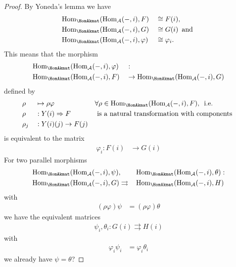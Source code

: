 \begin{proof}
By Yoneda's lemma we have 
\begin{alignat}{2}
&\mathrm{Hom}_{\HomAkmat}(\mathrm{Hom}_{\mathcal{A}}(-,i),F) &&\cong F(i), \\
&\mathrm{Hom}_{\HomAkmat}(\mathrm{Hom}_{\mathcal{A}}(-,i),G) &&\cong G(i)\, \text{ and } \\
&\mathrm{Hom}_{\HomAkmat}(\mathrm{Hom}_{\mathcal{A}}(-,i),\varphi) &&\cong \varphi_{i}.
\end{alignat}
This means that the morphism
\begin{alignat*}{2}
&\mathrm{Hom}_{\HomAkmat}(\mathrm{Hom}_{\mathcal{A}}(-,i),\varphi) &&:\\
&\mathrm{Hom}_{\HomAkmat}(\mathrm{Hom}_{\mathcal{A}}(-,i),F)
	&&\rightarrow \mathrm{Hom}_{\HomAkmat}(\mathrm{Hom}_{\mathcal{A}}(-,i),G)
\end{alignat*}
defined by
\begin{alignat*}{3}
&\rho &&\mapsto \rho\varphi &&\forall \rho \in \mathrm{Hom}_{\HomAkmat}(\mathrm{Hom}_{\mathcal{A}}(-,i),F),\,\text{ i.e. }\\
&\rho &&: Y(i) \Rightarrow F\, &&\text{ is a natural transformation with components }\\
&\rho_{j} &&: Y(i)(j) \rightarrow F(j)&&
\end{alignat*}
is equivalent to the matrix
\begin{align}
\varphi_{i} : F(i) &\rightarrow G(i)
\end{align}
For two parallel morphisms 
\begin{alignat}{2}
&\mathrm{Hom}_{\HomAkmat}(\mathrm{Hom}_{\mathcal{A}}(-,i),\psi),
&&\,\mathrm{Hom}_{\HomAkmat}(\mathrm{Hom}_{\mathcal{A}}(-,i),\theta) : \\
&\mathrm{Hom}_{\HomAkmat}(\mathrm{Hom}_{\mathcal{A}}(-,i),G)
\rightrightarrows &&\,\mathrm{Hom}_{\HomAkmat}(\mathrm{Hom}_{\mathcal{A}}(-,i),H)
\end{alignat}
with
\begin{align}
(\rho\varphi)\psi &= (\rho\varphi)\theta
\end{align}
we have the equivalent matrices
\begin{align}
\psi_{i}, \theta_{i} : G(i) \rightrightarrows H(i)
\end{align}
with
\begin{align}
\varphi_{i}\psi_{i} &= \varphi_{i}\theta_{i}
\end{align}
we already have $\psi = \theta$?
\end{proof}
